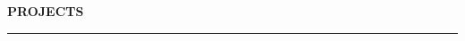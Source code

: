 \documentclass[notitlepage,10pt,a4paper]{article}
\newenvironment{resumesection}[1]{
    \header{#1}
}{}
\newcommand{\header}[1]{
    \vspace{2pt}
    \textcolor{accent1}{\Large \textbf{#1}}
    \vspace{6pt}\hrule\vspace{4pt}
}
\newcommand{\TECH}{
    \textcolor{accent3}{\small\textbf{SKILLS}}\small\,
}
\newcommand{\thingsep}{
    \vspace{4pt}
}
\newcommand{\LINK}[2]{
    \href{#1}{\textbf{#2}\,\,{\small\faExternalLink}}
}
\begin{document}
\begin{resumesection}{PROJECTS}
    


\end{resumesection}
\end{document}
